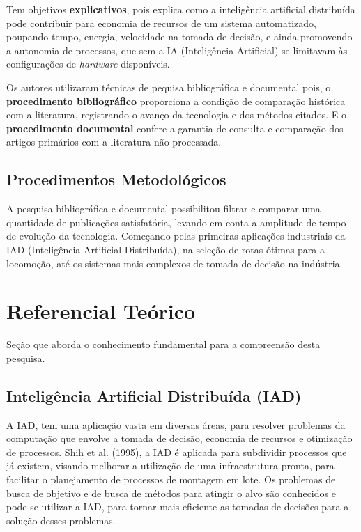 \documentclass[
	article,			    %
	12pt,				    %
	oneside,			    %
	a4paper,			    %
	chapter=TITLE,		    %
	section=TITLE,		    %
	subsection=TITLE,	    %
	english,			    %
	brazil,				    %
	sumario=tradicional
]{abntex2}
\begin{document}
Tem objetivos \textbf{explicativos}, pois explica como a inteligência artificial distribuída pode contribuir para economia de recursos de um sistema automatizado, poupando tempo, energia, velocidade na tomada de decisão, e ainda promovendo a autonomia de processos, que sem a IA (Inteligência Artificial) se limitavam às configurações de \emph{hardware} disponíveis.

Os autores utilizaram técnicas de pequisa bibliográfica e documental pois, o \textbf{procedimento bibliográfico} proporciona a condição de comparação histórica com a literatura, registrando o avanço da tecnologia e dos métodos citados. E o \textbf{procedimento documental} confere a garantia de consulta e comparação dos artigos primários com a literatura não processada.

\subsection{Procedimentos Metodológicos}
A pesquisa bibliográfica e documental possibilitou filtrar e comparar uma quantidade de publicações satisfatória, levando em conta a amplitude de tempo de evolução da tecnologia. Começando pelas primeiras aplicações industriais da IAD (Inteligência Artificial Distribuída), na seleção de rotas ótimas para a locomoção, até os sistemas mais complexos de tomada de decisão na indústria.

\section{Referencial Teórico}
Seção que aborda o conhecimento fundamental para a compreensão desta pesquisa.
\subsection{Inteligência Artificial Distribuída (IAD)}
A IAD, tem uma aplicação vasta em diversas áreas, para resolver problemas da computação que envolve a tomada de decisão, economia de recursos e otimização de processos. Shih et al. (1995), a IAD é aplicada para subdividir processos que já existem, visando melhorar a utilização de uma infraestrutura pronta, para facilitar o planejamento de processos de montagem em lote. Os problemas de busca de objetivo e de busca de métodos para atingir o alvo são conhecidos e pode-se utilizar a IAD, para tornar mais eficiente as tomadas de decisões para a solução desses problemas.
\end{document}
